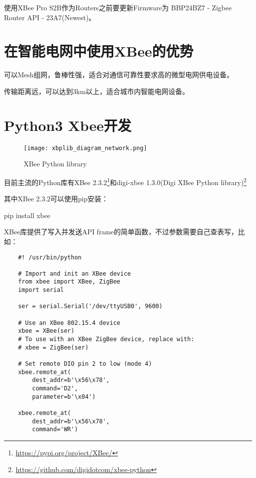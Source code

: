 使用XBee Pro S2B作为Routers之前要更新Firmware为 BBP24BZ7 - Zigbee Router API - 23A7(Newest)。





\section{在智能电网中使用XBee的优势}

可以Mesh组网，鲁棒性强，适合对通信可靠性要求高的微型电网供电设备。

传输距离远，可以达到3km以上，适合城市内智能电网设备。


\section{Python3 Xbee开发}

\begin{figure}[htbp]
    \centering
    \texttt{[image: xbplib\_diagram\_network.png]}
    \caption{XBee Python library}
    \label{fig:xbplib_diagram_network}
\end{figure}

目前主流的Python库有XBee 2.3.2\footnote{\url{https://pypi.org/project/XBee/}}和digi-xbee 1.3.0(Digi XBee Python library)\footnote{\url{https://github.com/digidotcom/xbee-python}}

其中XBee 2.3.2可以使用pip安装：

\begin{tcolorbox}
    pip install xbee
\end{tcolorbox}

XBee库提供了写入并发送API frame的简单函数，不过参数需要自己查表写，比如：

\begin{verbatim}
    #! /usr/bin/python

    # Import and init an XBee device
    from xbee import XBee, ZigBee
    import serial

    ser = serial.Serial('/dev/ttyUSB0', 9600)

    # Use an XBee 802.15.4 device
    xbee = XBee(ser)
    # To use with an XBee ZigBee device, replace with:
    # xbee = ZigBee(ser)

    # Set remote DIO pin 2 to low (mode 4)
    xbee.remote_at(
        dest_addr=b'\x56\x78',
        command='D2',
        parameter=b'\x04')

    xbee.remote_at(
        dest_addr=b'\x56\x78',
        command='WR')
\end{verbatim}

